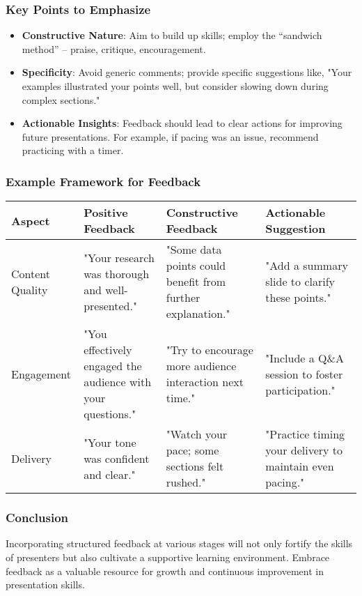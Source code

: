 \documentclass[aspectratio=169]{beamer}
\begin{document}
\begin{frame}[fragile]
    \frametitle{Key Points to Emphasize}
    \begin{itemize}
        \item \textbf{Constructive Nature}: Aim to build up skills; employ the “sandwich method” – praise, critique, encouragement.
        
        \item \textbf{Specificity}: Avoid generic comments; provide specific suggestions like, "Your examples illustrated your points well, but consider slowing down during complex sections."
        
        \item \textbf{Actionable Insights}: Feedback should lead to clear actions for improving future presentations. For example, if pacing was an issue, recommend practicing with a timer.
    \end{itemize}
\end{frame}

\begin{frame}[fragile]
    \frametitle{Example Framework for Feedback}
    \begin{tabular}{|l|l|l|l|}
        \hline
        \textbf{Aspect} & \textbf{Positive Feedback} & \textbf{Constructive Feedback} & \textbf{Actionable Suggestion} \\ \hline
        Content Quality & "Your research was thorough and well-presented." & "Some data points could benefit from further explanation." & "Add a summary slide to clarify these points." \\ \hline
        Engagement & "You effectively engaged the audience with your questions." & "Try to encourage more audience interaction next time." & "Include a Q\&A session to foster participation." \\ \hline
        Delivery & "Your tone was confident and clear." & "Watch your pace; some sections felt rushed." & "Practice timing your delivery to maintain even pacing." \\ \hline
    \end{tabular}
\end{frame}

\begin{frame}[fragile]
    \frametitle{Conclusion}
    Incorporating structured feedback at various stages will not only fortify the skills of presenters but also cultivate a supportive learning environment. Embrace feedback as a valuable resource for growth and continuous improvement in presentation skills.
\end{frame}
\end{document}
